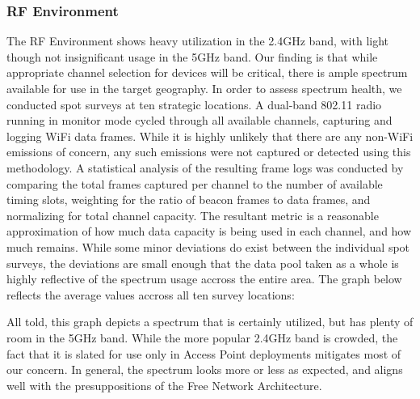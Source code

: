 \subsubsection{RF Environment}
The RF Environment shows heavy utilization in the 2.4GHz band, with light though
not insignificant usage in the 5GHz band. Our finding is that while appropriate
channel selection for devices will be critical, there is ample spectrum
available for use in the target geography. In order to assess spectrum health,
we conducted spot surveys at ten strategic locations. A dual-band 802.11 radio
running in monitor mode cycled through all available channels, capturing and
logging WiFi data frames. While it is highly unlikely that there are any non-WiFi
emissions of concern, any such emissions were not captured or detected using
this methodology. A statistical analysis of the resulting frame logs was conducted
by comparing the total frames captured per channel to the number of available
timing slots, weighting for the ratio of beacon frames to data frames, and
normalizing for total channel capacity. The resultant metric is a reasonable
approximation of how much data capacity is being used in each channel, and how
much remains. While some minor deviations do exist
between the individual spot surveys, the deviations are small enough that the
data pool taken as a whole is highly reflective of the spectrum usage accross
the entire area. The graph below reflects the average values accross all ten
survey locations: \par
\begin{center}
\end{center}
All told, this graph depicts a spectrum that is certainly utilized, but has plenty of room
in the 5GHz band. While the more popular 2.4GHz band is crowded, the fact that
it is slated for use only in Access Point deployments mitigates most of our
concern. In general, the spectrum looks more or less as expected, and aligns
well with the presuppositions of the Free Network Architecture.


